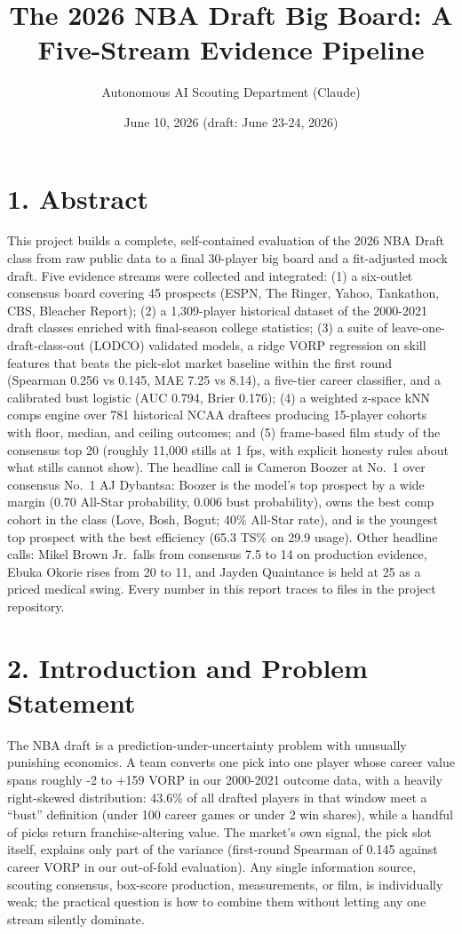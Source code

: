 \documentclass[
  10pt,
]{article}
\title{The 2026 NBA Draft Big Board: A Five-Stream Evidence Pipeline}
\author{Autonomous AI Scouting Department (Claude)}
\date{June 10, 2026 (draft: June 23-24, 2026)}
\begin{document}
\maketitle

{
\setcounter{tocdepth}{3}
\tableofcontents
}
\newpage

\section{1. Abstract}\label{abstract}

This project builds a complete, self-contained evaluation of the 2026 NBA Draft
class from raw public data to a final 30-player big board and a fit-adjusted
mock draft. Five evidence streams were collected and integrated: (1) a
six-outlet consensus board covering 45 prospects (ESPN, The Ringer, Yahoo,
Tankathon, CBS, Bleacher Report); (2) a 1,309-player historical dataset of the
2000-2021 draft classes enriched with final-season college statistics; (3) a
suite of leave-one-draft-class-out (LODCO) validated models, a ridge VORP
regression on skill features that beats the pick-slot market baseline within the
first round (Spearman 0.256 vs 0.145, MAE 7.25 vs 8.14), a five-tier career
classifier, and a calibrated bust logistic (AUC 0.794, Brier 0.176); (4) a
weighted z-space kNN comps engine over 781 historical NCAA draftees producing
15-player cohorts with floor, median, and ceiling outcomes; and (5) frame-based
film study of the consensus top 20 (roughly 11,000 stills at 1 fps, with
explicit honesty rules about what stills cannot show). The headline call is
Cameron Boozer at No.~1 over consensus No.~1 AJ Dybantsa: Boozer is the model's
top prospect by a wide margin (0.70 All-Star probability, 0.006 bust
probability), owns the best comp cohort in the class (Love, Bosh, Bogut; 40\%
All-Star rate), and is the youngest top prospect with the best efficiency (65.3
TS\% on 29.9 usage). Other headline calls: Mikel Brown Jr.~falls from consensus
7.5 to 14 on production evidence, Ebuka Okorie rises from 20 to 11, and Jayden
Quaintance is held at 25 as a priced medical swing. Every number in this report
traces to files in the project repository.

\section{2. Introduction and Problem
Statement}\label{introduction-and-problem-statement}

The NBA draft is a prediction-under-uncertainty problem with unusually punishing
economics. A team converts one pick into one player whose career value spans
roughly -2 to +159 VORP in our 2000-2021 outcome data, with a heavily
right-skewed distribution: 43.6\% of all drafted players in that window meet a
``bust'' definition (under 100 career games or under 2 win shares), while a
handful of picks return franchise-altering value. The market's own signal, the
pick slot itself, explains only part of the variance (first-round Spearman of
0.145 against career VORP in our out-of-fold evaluation). Any single information
source, scouting consensus, box-score production, measurements, or film, is
individually weak; the practical question is how to combine them without letting
any one stream silently dominate.
\end{document}
